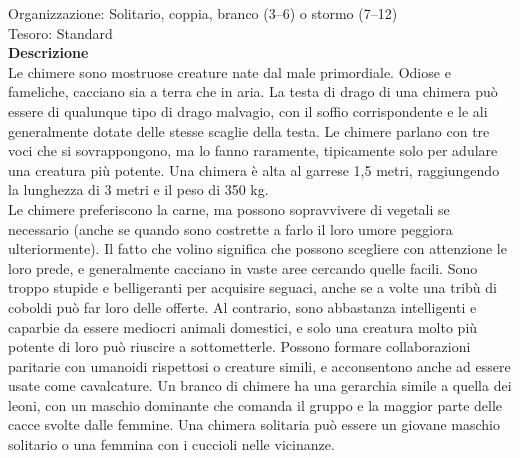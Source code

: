 \begin{multicols}{2}
Organizzazione: Solitario, coppia, branco (3–6) o stormo (7–12)\\
Tesoro: Standard\\
\textbf{Descrizione}\\
Le chimere sono mostruose creature nate dal male primordiale. Odiose e fameliche, cacciano sia a terra che in aria. La testa di drago di una chimera può essere di qualunque tipo di drago malvagio, con il soffio corrispondente e le ali generalmente dotate delle stesse scaglie della testa. Le chimere parlano con tre voci che si sovrappongono, ma lo fanno raramente, tipicamente solo per adulare una creatura più potente. Una chimera è alta al garrese 1,5 metri, raggiungendo la lunghezza di 3 metri e il peso di 350 kg.\\
Le chimere preferiscono la carne, ma possono sopravvivere di vegetali se necessario (anche se quando sono costrette a farlo il loro umore peggiora ulteriormente). Il fatto che volino significa che possono scegliere con attenzione le loro prede, e generalmente cacciano in vaste aree cercando quelle facili. Sono troppo stupide e belligeranti per acquisire seguaci, anche se a volte una tribù di coboldi può far loro delle offerte. Al contrario, sono abbastanza intelligenti e caparbie da essere mediocri animali domestici, e solo una creatura molto più potente di loro può riuscire a sottometterle. Possono formare collaborazioni paritarie con umanoidi rispettosi o creature simili, e acconsentono anche ad essere usate come cavalcature. Un branco di chimere ha una gerarchia simile a quella dei leoni, con un maschio dominante che comanda il gruppo e la maggior parte delle cacce svolte dalle femmine. Una chimera solitaria può essere un giovane maschio solitario o una femmina con i cuccioli nelle vicinanze.\\


\end{multicols}
